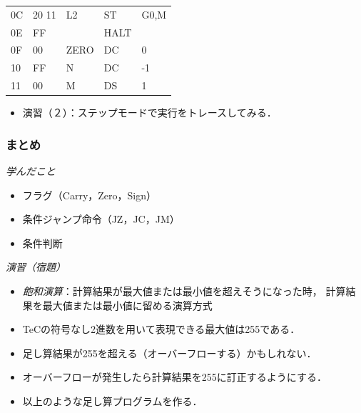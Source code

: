 \documentclass{beamer}                 %
\begin{document}
\begin{frame}
\begin{minipage}{0.5\columnwidth}
{\begin{center}
\begin{tabular}{|l|l|l|l l|}
        0C & 20 11 & L2   & ST   & G0,M    \\
        0E & FF    &      & HALT &         \\
        0F & 00    & ZERO & DC   & 0       \\
        10 & FF    & N    & DC   & -1      \\
        11 & 00    & M    & DS   & 1       \\
        \hline
      \end{tabular}
    \end{center}}
  \end{minipage}
  \vfill
  \begin{itemize}
  \item 演習（２）：ステップモードで実行をトレースしてみる．
  \end{itemize}
\end{frame}

\begin{frame}
  \frametitle{まとめ}
  \emph{学んだこと}
  \begin{itemize}
  \item フラグ（Carry，Zero，Sign）
  \item 条件ジャンプ命令（JZ，JC，JM）
  \item 条件判断
  \end{itemize}
  \vfill

  \emph{演習（宿題）}
  \begin{itemize}
  \item \emph{飽和演算}：計算結果が最大値または最小値を超えそうになった時，
    計算結果を最大値または最小値に留める演算方式
  \item TeCの符号なし2進数を用いて表現できる最大値は255である．
  \item 足し算結果が255を超える（オーバーフローする）かもしれない．
  \item オーバーフローが発生したら計算結果を255に訂正するようにする．
  \item 以上のような足し算プログラムを作る．
  \end{itemize}
  \vfill
\end{frame}
\end{document}
